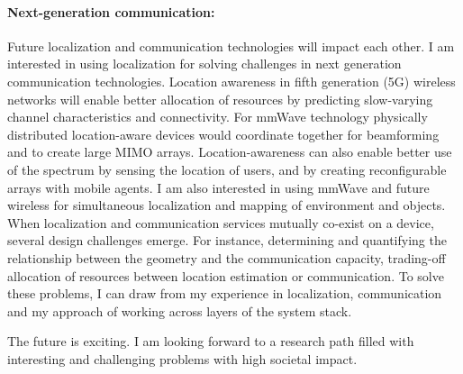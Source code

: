 \documentclass[10pt]{article}
\begin{document}
\paragraph{Next-generation communication: }
Future localization and communication technologies will impact each other. 
I am interested in using localization for solving challenges in next generation communication technologies. %
Location awareness in fifth generation (5G) wireless networks will enable better allocation of resources by predicting slow-varying channel characteristics and connectivity. %
For mmWave technology physically distributed location-aware devices would coordinate together for beamforming and to create large MIMO arrays. 
Location-awareness can also enable better use of the spectrum by sensing the location of users, and by creating reconfigurable arrays with mobile agents. 
I am also interested in using mmWave and future wireless for simultaneous localization and mapping of environment and objects. 
When localization and communication services mutually co-exist on a device, several design challenges emerge. For instance, determining and quantifying the relationship between the geometry and the communication capacity, trading-off allocation of resources between location estimation or communication. To solve these problems, I can draw from my experience in localization, communication and my approach of working across layers of the system stack. 

The future is exciting. I am looking forward to a research path filled with interesting and challenging problems with high societal impact. %

\end{document}
